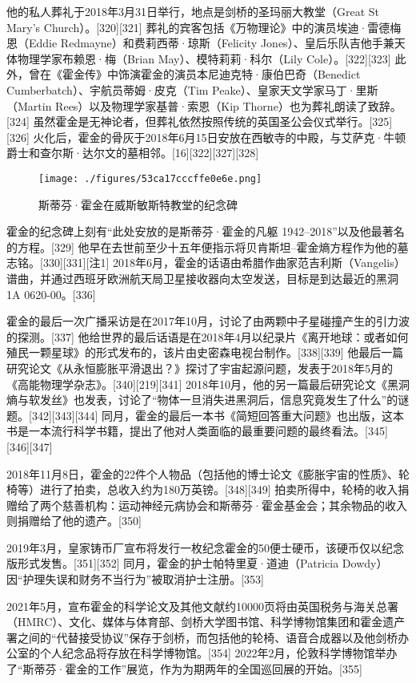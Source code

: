 他的私人葬礼于2018年3月31日举行，地点是剑桥的圣玛丽大教堂（Great St Mary's Church）。[320][321] 葬礼的宾客包括《万物理论》中的演员埃迪·雷德梅恩（Eddie Redmayne）和费莉西蒂·琼斯（Felicity Jones）、皇后乐队吉他手兼天体物理学家布赖恩·梅（Brian May）、模特莉莉·科尔（Lily Cole）。[322][323] 此外，曾在《霍金传》中饰演霍金的演员本尼迪克特·康伯巴奇（Benedict Cumberbatch）、宇航员蒂姆·皮克（Tim Peake）、皇家天文学家马丁·里斯（Martin Rees）以及物理学家基普·索恩（Kip Thorne）也为葬礼朗读了致辞。[324] 虽然霍金是无神论者，但葬礼依然按照传统的英国圣公会仪式举行。[325][326] 火化后，霍金的骨灰于2018年6月15日安放在西敏寺的中殿，与艾萨克·牛顿爵士和查尔斯·达尔文的墓相邻。[16][322][327][328]
\begin{figure}[ht]
\centering
\texttt{[image: ./figures/53ca17cccffe0e6e.png]}
\caption{斯蒂芬·霍金在威斯敏斯特教堂的纪念碑} \label{fig_HJ_7}
\end{figure}
霍金的纪念碑上刻有“此处安放的是斯蒂芬·霍金的凡躯 1942–2018”以及他最著名的方程。[329] 他早在去世前至少十五年便指示将贝肯斯坦–霍金熵方程作为他的墓志铭。[330][331][注1] 2018年6月，霍金的话语由希腊作曲家范吉利斯（Vangelis）谱曲，并通过西班牙欧洲航天局卫星接收器向太空发送，目标是到达最近的黑洞1A 0620-00。[336]

霍金的最后一次广播采访是在2017年10月，讨论了由两颗中子星碰撞产生的引力波的探测。[337] 他给世界的最后话语是在2018年4月以纪录片《离开地球：或者如何殖民一颗星球》的形式发布的，该片由史密森电视台制作。[338][339] 他最后一篇研究论文《从永恒膨胀平滑退出？》探讨了宇宙起源问题，发表于2018年5月的《高能物理学杂志》。[340][219][341] 2018年10月，他的另一篇最后研究论文《黑洞熵与软发丝》也发表，讨论了“物体一旦消失进黑洞后，信息究竟发生了什么”的谜题。[342][343][344] 同月，霍金的最后一本书《简短回答重大问题》也出版，这本书是一本流行科学书籍，提出了他对人类面临的最重要问题的最终看法。[345][346][347]

2018年11月8日，霍金的22件个人物品（包括他的博士论文《膨胀宇宙的性质》、轮椅等）进行了拍卖，总收入约为180万英镑。[348][349] 拍卖所得中，轮椅的收入捐赠给了两个慈善机构：运动神经元病协会和斯蒂芬·霍金基金会；其余物品的收入则捐赠给了他的遗产。[350]

2019年3月，皇家铸币厂宣布将发行一枚纪念霍金的50便士硬币，该硬币仅以纪念版形式发售。[351][352] 同月，霍金的护士帕特里夏·道迪（Patricia Dowdy）因“护理失误和财务不当行为”被取消护士注册。[353]

2021年5月，宣布霍金的科学论文及其他文献约10000页将由英国税务与海关总署（HMRC）、文化、媒体与体育部、剑桥大学图书馆、科学博物馆集团和霍金遗产署之间的“代替接受协议”保存于剑桥，而包括他的轮椅、语音合成器以及他剑桥办公室的个人纪念品将存放在科学博物馆。[354] 2022年2月，伦敦科学博物馆举办了“斯蒂芬·霍金的工作”展览，作为为期两年的全国巡回展的开始。[355]

